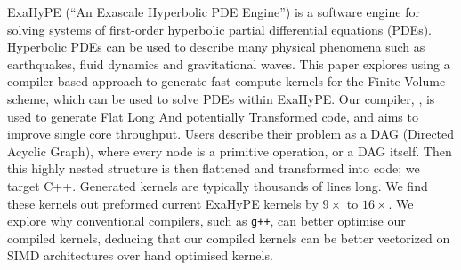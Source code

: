 ExaHyPE (``An Exascale Hyperbolic PDE Engine'') is a software engine for solving systems of first-order hyperbolic partial differential equations (PDEs).
Hyperbolic PDEs can be used to describe many physical phenomena such as earthquakes, fluid dynamics and gravitational waves.
This paper explores using a compiler based approach to generate fast compute kernels for the Finite Volume scheme, which can be used to solve PDEs within ExaHyPE.
Our compiler, \phlat, is used to generate Flat Long And potentially Transformed code, and aims to improve single core throughput.
Users describe their problem as a DAG (Directed Acyclic Graph), where every node is a primitive operation, or a DAG itself.
Then this highly nested structure is then flattened and transformed into code; we target C++.
Generated kernels are typically thousands of lines long.
We find these kernels out preformed current ExaHyPE kernels by $9\times$ to $16\times$.
We explore why conventional compilers, such as \texttt{g++}, can better optimise our compiled kernels, deducing that our compiled kernels can be better vectorized on SIMD architectures over hand optimised kernels.
